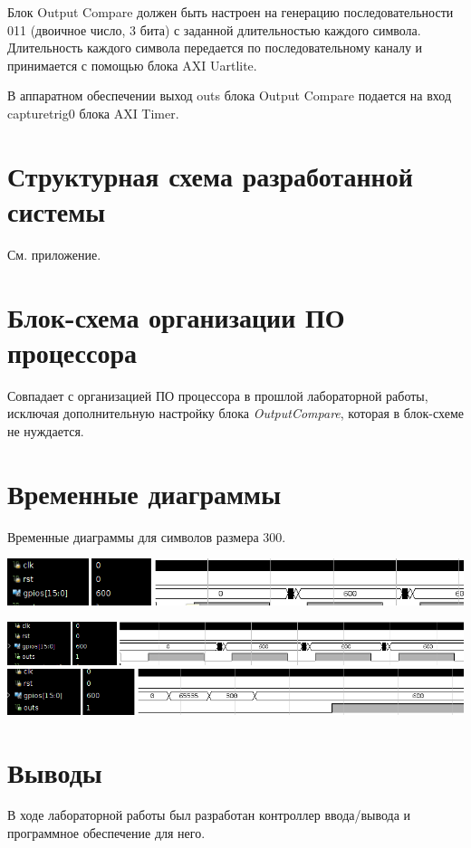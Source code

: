 \documentclass[12pt, a4paper] {ncc}
\begin{document}
Блок Output Compare должен быть настроен на генерацию последовательности 
011 (двоичное число, 3 бита) с заданной длительностью каждого символа. 
Длительность каждого символа передается по последовательному каналу и 
принимается с помощью блока AXI Uartlite. 
 
В аппаратном обеспечении выход outs блока Output Compare подается на вход 
capturetrig0  блока AXI Timer. 

\section{Структурная схема разработанной системы}
	См. приложение.

\section{Блок-схема организации ПО процессора}

	Совпадает с организацией ПО процессора в прошлой лабораторной работы, исключая
	дополнительную настройку блока {\it OutputCompare}, которая в блок-схеме не
	нуждается.

\section{Временные диаграммы}

	Временные диаграммы для символов размера 300.

	\includegraphics[scale=0.5]{./600_close.png}

	\includegraphics[scale=0.5]{./600_not_too_close.png}
	\includegraphics[scale=0.5]{./600_too_close.png}


\section{Выводы}

В ходе лабораторной работы был разработан контроллер ввода/вывода и программное
обеспечение для него.


 
\end{document}
